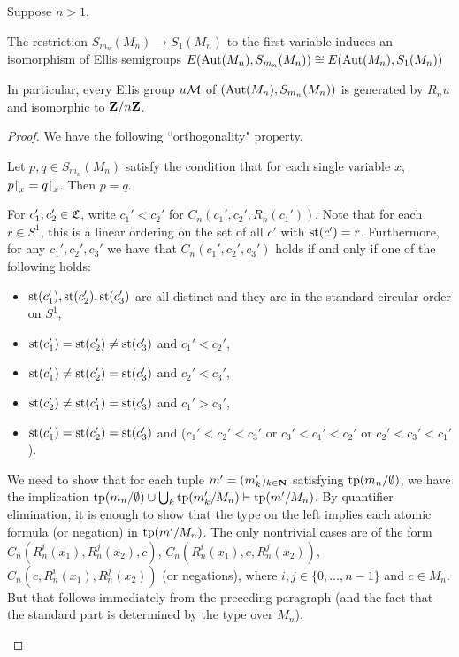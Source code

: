 	\begin{lem}
		\label{lem:ellis_group_onesort}
		Suppose $n>1$.
		
		The restriction $S_{m_n}(M_n)\to S_1(M_n)$ to the first variable induces an isomorphism of Ellis semigroups $E(\operatorname{{Aut}}(M_n),S_{m_n}(M_n))\cong E(\operatorname{{Aut}}(M_n),S_1(M_n))$
		
		In particular, every Ellis group $u{\mathcal M}$ of $(\operatorname{{Aut}}(M_n),S_{m_n}(M_n))$ is generated by $R_nu$ and isomorphic to ${\mathbf{Z}}/n{\mathbf{Z}}$.
	\end{lem}
	\begin{proof}
		We have the following ``orthogonality" property.
		
		\begin{clm*}
			Let $p,q\in S_{m_n}(M_n)$ satisfy the condition that for each single variable $x$, $p\mathord{\upharpoonright}_x=q\mathord{\upharpoonright}_x$. Then $p=q$.
		\end{clm*}
		\begin{clmproof}
			For $c_1',c_2'\in {\mathfrak C}$, write $c_1'<c_2'$ for $C_n(c_1',c_2',R_n(c_1'))$. Note that for each $r\in S^1$, this is a linear ordering on the set of all $c'$ with $\operatorname{{st}}(c')=r$. Furthermore, for any $c_1',c_2',c_3'$ we have that $C_n(c_1',c_2',c_3')$ holds if and only if one of the following holds:
			\begin{itemize}
				\item
				$\operatorname{{st}}(c_1'),\operatorname{{st}}(c_2'),\operatorname{{st}}(c_3')$ are all distinct and they are in the standard circular order on $S^1$,
				\item
				$\operatorname{{st}}(c_1')=\operatorname{{st}}(c_2')\neq \operatorname{{st}}(c_3')$ and $c_1'<c_2'$,
				\item
				$\operatorname{{st}}(c_1')\neq\operatorname{{st}}(c_2')=\operatorname{{st}}(c_3')$ and $c_2'<c_3'$,
				\item
				$\operatorname{{st}}(c_2')\neq\operatorname{{st}}(c_1')=\operatorname{{st}}(c_3')$ and $c_1'>c_3'$,
				\item
				$\operatorname{{st}}(c_1')=\operatorname{{st}}(c_2')=\operatorname{{st}}(c_3')$ and ($c_1'<c_2'<c_3'$ or $c_3'<c_1'<c_2'$ or $c_2'<c_3'<c_1'$).
			\end{itemize}
			
			We need to show that for each tuple $m'=(m'_k)_{k\in {\mathbf{N}}}$ satisfying $\operatorname{{tp}}(m_n/\emptyset)$, we have the implication $\operatorname{{tp}}(m_n/\emptyset)\cup\bigcup_k \operatorname{{tp}}(m'_k/M_n)\vdash \operatorname{{tp}}(m'/M_n)$. By quantifier elimination, it is enough to show that the type on the left implies each atomic formula (or negation) in $\operatorname{{tp}}(m'/M_n)$. The only nontrivial cases are of the form $C_n(R_n^i(x_1),R_n^j(x_2),c)$, $C_n(R_n^i(x_1),c,R_n^j(x_2))$, $C_n(c,R_n^i(x_1),R_n^j(x_2))$ (or negations), where $i,j \in \{0,\dots,n-1\}$ and $c \in M_n$. But that follows immediately from the preceding paragraph (and the fact that the standard part is determined by the type over $M_n$).
		\end{clmproof}
		

\end{proof}
